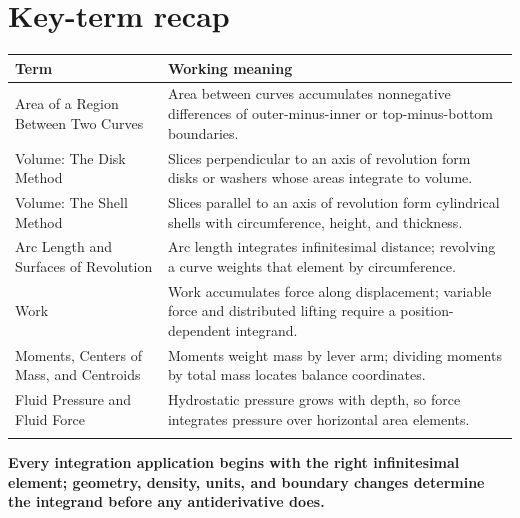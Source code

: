 \documentclass[11pt]{article}
\begin{document}
\section{Key-term recap}
\small
\begin{longtable}{@{}>{\RaggedRight\arraybackslash}p{}>{\RaggedRight\arraybackslash}p{}@{}}
\toprule
\textbf{Term} & \textbf{Working meaning}\\
\midrule\endhead
Area of a Region Between Two Curves & Area between curves accumulates nonnegative differences of outer-minus-inner or top-minus-bottom boundaries. \\\addlinespace[2pt]
Volume: The Disk Method & Slices perpendicular to an axis of revolution form disks or washers whose areas integrate to volume. \\\addlinespace[2pt]
Volume: The Shell Method & Slices parallel to an axis of revolution form cylindrical shells with circumference, height, and thickness. \\\addlinespace[2pt]
Arc Length and Surfaces of Revolution & Arc length integrates infinitesimal distance; revolving a curve weights that element by circumference. \\\addlinespace[2pt]
Work & Work accumulates force along displacement; variable force and distributed lifting require a position-dependent integrand. \\\addlinespace[2pt]
Moments, Centers of Mass, and Centroids & Moments weight mass by lever arm; dividing moments by total mass locates balance coordinates. \\\addlinespace[2pt]
Fluid Pressure and Fluid Force & Hydrostatic pressure grows with depth, so force integrates pressure over horizontal area elements. \\\addlinespace[2pt]
\bottomrule
\end{longtable}
\normalsize

\enlargethispage{4\baselineskip}
\begin{tcolorbox}[title=One-sentence takeaway,fonttitle=\bfseries,colback=Ink,colframe=Ink,coltext=white,coltitle=white,arc=2mm,boxrule=0pt]
\centering\bfseries Every integration application begins with the right infinitesimal element; geometry, density, units, and boundary changes determine the integrand before any antiderivative does.
\end{tcolorbox}
\end{document}
